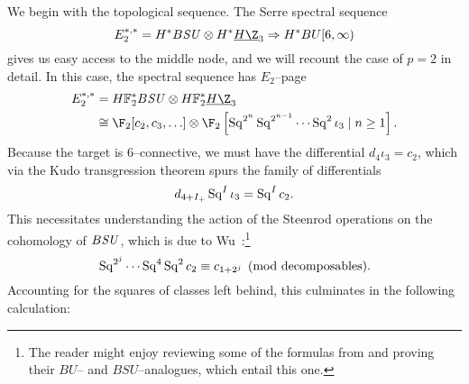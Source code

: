 We begin with the topological sequence.  The Serre spectral sequence \[E_2^{*, *} = H^* B\SU \otimes H^* \OS{H\Z}{3} \Rightarrow H^* BU[6, \infty)\] gives us easy access to the middle node, and we will recount the case of \(p = 2\) in detail.  In this case, the spectral sequence has \(E_2\)--page
\begin{align*}
E_2^{*, *} & = \HFtwo^* B\SU \otimes \HFtwo^* \OS{H\Z}{3} \\
& \cong \F_2[c_2, c_3, \ldots] \otimes \F_2\left[\Sq^{2^n} \Sq^{2^{n-1}} \cdots \Sq^2 \iota_3 \mid n \ge 1 \right].
\end{align*}
Because the target is \(6\)--connective, we must have the differential \(d_4 \iota_3 = c_2\), which via the Kudo transgression theorem spurs the family of differentials \[d_{4+I_+} \operatorname{Sq}^I \iota_3 = \operatorname{Sq}^I c_2.\]  This necessitates understanding the action of the Steenrod operations on the cohomology of \(B\mathit{SU}\), which is due to Wu~\cite[Section 23.6]{MayConciseCourse}:\footnote{The reader might enjoy reviewing some of the formulas from  and proving their \(BU\)-- and \(BSU\)--analogues, which entail this one.} \[\operatorname{Sq}^{2^j} \cdots \operatorname{Sq}^4 \operatorname{Sq}^2 c_2 \equiv c_{1 + 2^j} \pmod{\text{decomposables}}.\]  Accounting for the squares of classes left behind, this culminates in the following calculation:

